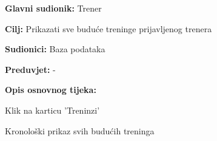 					\noindent {}
					\begin{packed_item}
	
						\item \textbf{Glavni sudionik: }Trener
						\item  \textbf{Cilj: } Prikazati sve buduće treninge prijavljenog trenera
						\item  \textbf{Sudionici: } Baza podataka
						\item  \textbf{Preduvjet: } -
						\item  \textbf{Opis osnovnog tijeka:}
						
						\item[] \begin{packed_enum}
	
							\item Klik na karticu 'Treninzi'
							\item Kronološki prikaz svih budućih treninga 
						\end{packed_enum}
					\end{packed_item}
					
					\eject
					
